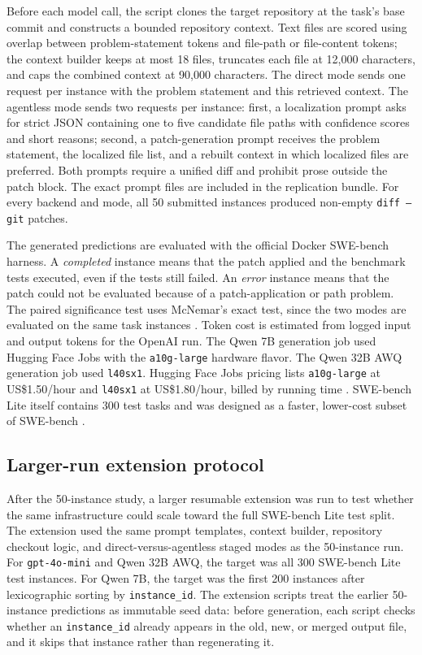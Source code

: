 \documentclass[preprint,12pt]{elsarticle}
\begin{document}
Before each model call, the script clones the target repository at the task's base commit and constructs a bounded repository context. Text files are scored using overlap between problem-statement tokens and file-path or file-content tokens; the context builder keeps at most 18 files, truncates each file at 12,000 characters, and caps the combined context at 90,000 characters. The direct mode sends one request per instance with the problem statement and this retrieved context. The agentless mode sends two requests per instance: first, a localization prompt asks for strict JSON containing one to five candidate file paths with confidence scores and short reasons; second, a patch-generation prompt receives the problem statement, the localized file list, and a rebuilt context in which localized files are preferred. Both prompts require a unified diff and prohibit prose outside the patch block. The exact prompt files are included in the replication bundle. For every backend and mode, all 50 submitted instances produced non-empty \texttt{diff --git} patches.

The generated predictions are evaluated with the official Docker SWE-bench harness. A \textit{completed} instance means that the patch applied and the benchmark tests executed, even if the tests still failed. An \textit{error} instance means that the patch could not be evaluated because of a patch-application or path problem. The paired significance test uses McNemar's exact test, since the two modes are evaluated on the same task instances \cite{fagerland2013mcnemar}. Token cost is estimated from logged input and output tokens for the OpenAI run. The Qwen 7B generation job used Hugging Face Jobs with the \texttt{a10g-large} hardware flavor. The Qwen 32B AWQ generation job used \texttt{l40sx1}. Hugging Face Jobs pricing lists \texttt{a10g-large} at US\$1.50/hour and \texttt{l40sx1} at US\$1.80/hour, billed by running time \cite{huggingface2026jobspricing}. SWE-bench Lite itself contains 300 test tasks and was designed as a faster, lower-cost subset of SWE-bench \cite{swebenchlitepage,swebenchleaderboard}.

\subsection{Larger-run extension protocol}

After the 50-instance study, a larger resumable extension was run to test whether the same infrastructure could scale toward the full SWE-bench Lite test split. The extension used the same prompt templates, context builder, repository checkout logic, and direct-versus-agentless staged modes as the 50-instance run. For \texttt{gpt-4o-mini} and Qwen 32B AWQ, the target was all 300 SWE-bench Lite test instances. For Qwen 7B, the target was the first 200 instances after lexicographic sorting by \texttt{instance\_id}. The extension scripts treat the earlier 50-instance predictions as immutable seed data: before generation, each script checks whether an \texttt{instance\_id} already appears in the old, new, or merged output file, and it skips that instance rather than regenerating it.
\end{document}
